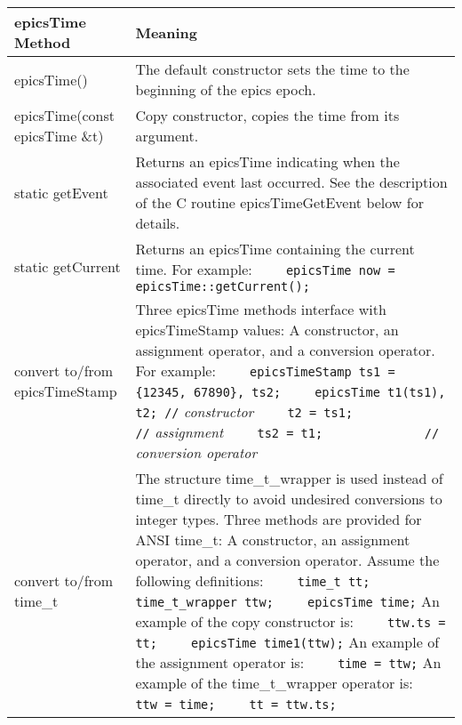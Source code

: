 \begin{center}
\begin{longtable}{p{2in}p{4.75in}}
\textbf{epicsTime Method} & \textbf{Meaning}\\
\hline \endhead
epicsTime() &
The default constructor sets the time to the beginning of the epics epoch.\\

epicsTime(const epicsTime \&t) &
Copy constructor, copies the time from its argument.\\

static getEvent &
Returns an epicsTime indicating when the associated event last occurred.
See the description of the C routine epicsTimeGetEvent below for details.\\

static getCurrent &
Returns an epicsTime containing the current time.
For example:\newline
\verb|    epicsTime now = epicsTime::getCurrent();|\\

convert to/from epicsTimeStamp &
Three epicsTime methods interface with epicsTimeStamp values:
A constructor, an assignment operator, and a conversion operator.
For example:\newline
\verb|    epicsTimeStamp ts1 = {12345, 67890}, ts2;| \newline
\verb|    epicsTime t1(ts1), t2; //| \emph{constructor} \newline
\verb|    t2 = ts1;              //| \emph{assignment} \newline
\verb|    ts2 = t1;              //| \emph{conversion operator} \\

convert to/from time\_t &
The structure time\_t\_wrapper is used instead of time\_t directly to avoid undesired conversions to integer types.
Three methods are provided for ANSI time\_t:
A constructor, an assignment operator, and a conversion operator.
Assume the following definitions:\newline
\verb|    time_t tt;| \newline
\verb|    time_t_wrapper ttw;| \newline
\verb|    epicsTime time;| \newline
An example of the copy constructor is: \newline
\verb|    ttw.ts = tt;| \newline
\verb|    epicsTime time1(ttw);| \newline
An example of the assignment operator is: \newline
\verb|    time = ttw;| \newline
An example of the time\_t\_wrapper operator is: \newline
\verb|    ttw = time;| \newline
\verb|    tt = ttw.ts;| \\


\end{longtable}
\end{center}
